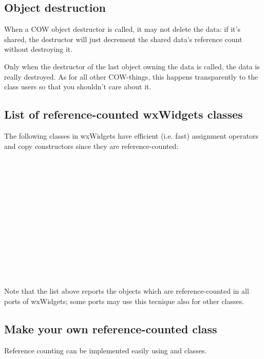\subsection{Object destruction}\label{refcountdestruct}

When a COW object destructor is called, it may not delete the data: if it's shared,
the destructor will just decrement the shared data's reference count without destroying it.

Only when the destructor of the last object owning the data is called, the data is really
destroyed. As for all other COW-things, this happens transparently to the class users so
that you shouldn't care about it.


\subsection{List of reference-counted wxWidgets classes}\label{refcountlist}

The following classes in wxWidgets have efficient (i.e. fast) assignment operators
and copy constructors since they are reference-counted:

\\
\\
\\
\\
\\
\\
\\
\\
\\
\\
\\
\\

Note that the list above reports the objects which are reference-counted in all ports of
wxWidgets; some ports may use this tecnique also for other classes.
\subsection{Make your own reference-counted class}\label{wxobjectoverview}

Reference counting can be implemented easily using 
and  classes.

